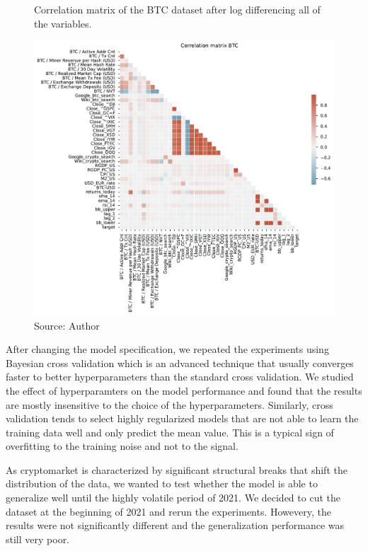 \begin{figure}[!h]
    \centering
    \caption{Correlation matrix of the BTC dataset after
    log differencing all of the variables.}
    \includegraphics[width=1\textwidth]{Figures/Corr_btc_logdiff.pdf}
    \caption*{Source: Author}
    \label{fig:Corr_btc_logdiff}
\end{figure}

After changing the model specification, we repeated the experiments
using Bayesian cross validation which is 
an advanced technique that 
usually converges faster to better hyperparameters than the standard
cross validation. 
We studied the effect of hyperparamters on the model performance
and found that the results are mostly insensitive to the choice of the
hyperparameters. Similarly, cross validation tends to 
select highly regularized models that 
are not able to learn the training data well and only predict the mean value.
This is a typical sign of overfitting to the training noise and
not to the signal. 


As cryptomarket is characterized by significant structural breaks
that shift the distribution of the data, we wanted
to test whether the model is able to generalize well
until the highly volatile period of 2021. We decided to cut 
the dataset at the beginning of 2021 and rerun the experiments.
Howevery, the results were not significantly different and the 
generalization performance was still very poor.


